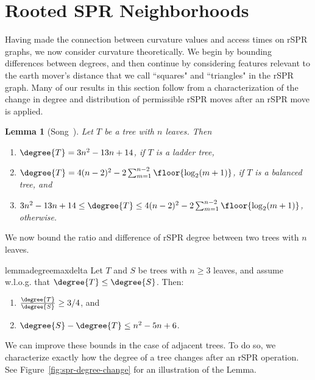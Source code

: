 \documentclass[11pt,onecolumn,conference]{IEEEtran}
\newtheorem{lemma}[theorem]{Lemma}
\newcommand{\cuttable}[2][]{%
    \ifthenelse{\equal{#1}{}}%
		{}%
		{#1}%
}
\begin{document}
\section{Rooted SPR Neighborhoods}
\label{sec:neighborhoods}
Having made the connection between curvature values and access times on rSPR graphs, we now consider curvature theoretically.
We begin by bounding differences between degrees, and then continue by considering features relevant to the earth mover's distance that we call ``squares" and ``triangles" in the rSPR graph.
Many of our results in this section follow from a characterization of the change in degree and distribution of permissible rSPR moves after an rSPR move is applied.

\begin{lemma}[{Song~\cite{Song2003-gf}}]
\cuttable{    \pushQED{\qed}}
	\label{lem:degree_extremes}
	Let $T$ be a tree with $n$ leaves. Then
	\begin{enumerate}
		\item $\degree{T} = 3n^2 - 13n + 14$, if $T$ is a ladder tree,
		\item $\degree{T} = 4(n-2)^2 - 2 \sum_{m=1}^{n-2} \floor{\log_2(m+1)}$, if $T$ is a balanced tree, and
		\item  $3n^2 - 13n + 14 \le \degree{T} \le 4(n-2)^2 - 2 \sum_{m=1}^{n-2} \floor{\log_2(m+1)}$, otherwise.
	\end{enumerate}
\cuttable{    \popQED}
\end{lemma}

We now bound the ratio and difference of rSPR degree between two trees with $n$ leaves.
\begin{restatable}{lemma}{degreemaxdelta}
	\label{lem:degree_max_delta}
	Let $T$ and $S$ be trees with $n \ge 3$ leaves, and assume w.l.o.g. that $\degree{T} \le \degree{S}$.
	Then:
	\begin{enumerate}
		\item $\frac{\degree{T}}{\degree{S}} \ge 3/4$, and
		\item $\degree{S} - \degree{T} \le n^2 - 5n + 6$.
	\end{enumerate}
\end{restatable}

We can improve these bounds in the case of adjacent trees.
To do so, we \cuttable{require the following lemma that }characterize\cuttable{s} exactly how the degree of a tree changes after an rSPR operation.
See Figure~\ref{fig:spr-degree-change} for an illustration of the Lemma.
\end{document}
